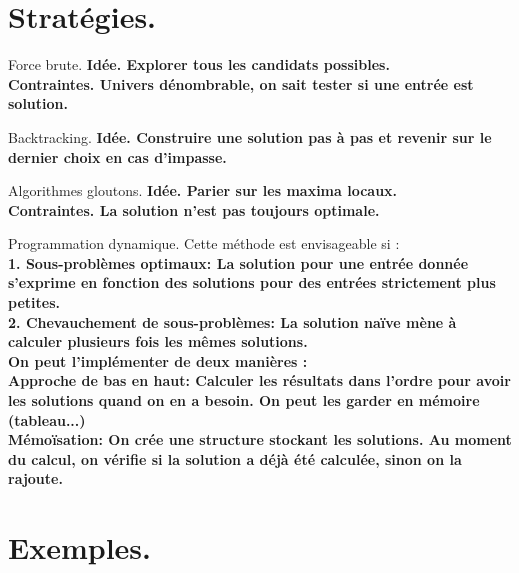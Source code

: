 \documentclass[french, 11pt]{article}
\begin{document}


\section{Stratégies.}

\begin{defi}{Force brute.}{}
    \bf{Idée.} Explorer tous les candidats possibles.\\
    \bf{Contraintes.} Univers dénombrable, on sait tester si une entrée est solution.
\end{defi}

\vspace*{-0.7cm}

\begin{defi}{Backtracking.}{}
    \bf{Idée.} Construire une solution pas à pas et revenir sur le dernier choix en cas d'impasse.
\end{defi}

\vspace*{-0.7cm}

\begin{defi}{Algorithmes gloutons.}{}
    \bf{Idée.} Parier sur les maxima locaux.\\
    \bf{Contraintes.} La solution n'est pas toujours optimale.
\end{defi}

\vspace*{-0.7cm}

\begin{defi}{Programmation dynamique.}{}
    Cette méthode est envisageable si :\\
    \bf{1. Sous-problèmes optimaux:} La solution pour une entrée donnée s'exprime en fonction des solutions pour des entrées strictement plus petites.\\
    \bf{2. Chevauchement de sous-problèmes:} La solution naïve mène à calculer plusieurs fois les mêmes solutions.\\
    On peut l'implémenter de deux manières :\\
    \bf{Approche de bas en haut:} Calculer les résultats dans l'ordre pour avoir les solutions quand on en a besoin. On peut les garder en mémoire (tableau...)\\
    \bf{Mémoïsation:} On crée une structure stockant les solutions. Au moment du calcul, on vérifie si la solution a déjà été calculée, sinon on la rajoute.
\end{defi}

\section{Exemples.}
\end{document}
